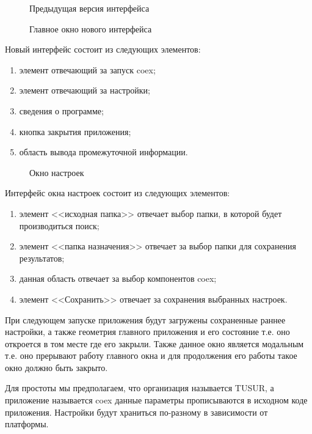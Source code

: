 

\begin{figure}[!ht]
\caption{ Предыдущая версия интерфейса }
\label{ship_1:ship_1}
\end{figure}

\begin{figure}[!ht]
\caption{ Главное окно нового интерфейса }
\label{ship_2:ship_2}
\end{figure}

Новый интерфейс состоит из следующих элементов:
\begin{enumerate}
  \item элемент отвечающий за запуск coex;
  \item элемент отвечающий за настройки;
  \item сведения о программе;
  \item кнопка закрытия приложения;
  \item область вывода промежуточной информации.
\end{enumerate}

\begin{figure}[h!]
\caption{ Окно настроек }
\label{ship_3:ship_3}
\end{figure}

Интерфейс окна настроек состоит из следующих элементов:
\begin{enumerate}
  \item элемент <<исходная папка>> отвечает выбор папки, в которой будет производиться поиск;
  \item элемент <<папка назначения>> отвечает за выбор папки для сохранения результатов;
  \item данная область отвечает за выбор компонентов coex;
  \item элемент <<Сохранить>> отвечает за сохранения выбранных настроек.
\end{enumerate}

При следующем запуске приложения будут загружены сохраненные раннее настройки, а также геометрия главного приложения и его состояние т.е. оно откроется в том месте где его закрыли. Также данное окно является модальным т.е. оно прерывают работу главного окна и для продолжения его работы такое окно должно быть закрыто.

Для простоты мы предполагаем, что организация называется TUSUR, а приложение называется coex данные параметры прописываются в исходном коде приложения. Настройки будут храниться по-разному в зависимости от платформы.

